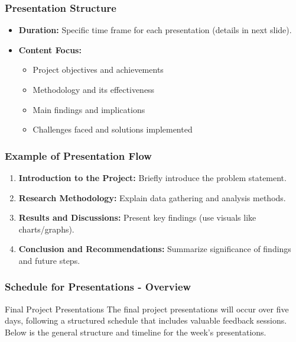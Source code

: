 \documentclass[aspectratio=169]{beamer}
\begin{document}
\begin{frame}[fragile]
    \frametitle{Presentation Structure}
    \begin{itemize}
        \item \textbf{Duration:} Specific time frame for each presentation (details in next slide).
        \item \textbf{Content Focus:}
        \begin{itemize}
            \item Project objectives and achievements
            \item Methodology and its effectiveness
            \item Main findings and implications
            \item Challenges faced and solutions implemented
        \end{itemize}
    \end{itemize}
\end{frame}

\begin{frame}[fragile]
    \frametitle{Example of Presentation Flow}
    \begin{enumerate}
        \item \textbf{Introduction to the Project:} Briefly introduce the problem statement.
        \item \textbf{Research Methodology:} Explain data gathering and analysis methods.
        \item \textbf{Results and Discussions:} Present key findings (use visuals like charts/graphs).
        \item \textbf{Conclusion and Recommendations:} Summarize significance of findings and future steps.
    \end{enumerate}
\end{frame}

\begin{frame}[fragile]
    \frametitle{Schedule for Presentations - Overview}
    \begin{block}{Final Project Presentations}
        The final project presentations will occur over five days, following a structured schedule that includes valuable feedback sessions. Below is the general structure and timeline for the week's presentations.
    \end{block}
\end{frame}
\end{document}
